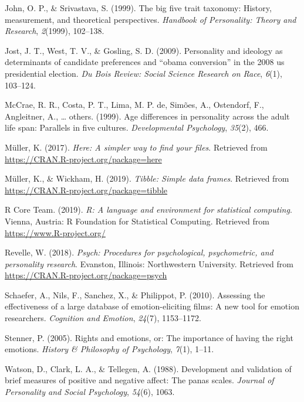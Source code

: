 \documentclass[man]{apa6}
\begin{document}
\hypertarget{ref-john1999big}{}
John, O. P., \& Srivastava, S. (1999). The big five trait taxonomy:
History, measurement, and theoretical perspectives. \emph{Handbook of
Personality: Theory and Research}, \emph{2}(1999), 102--138.

\hypertarget{ref-jost2009personality}{}
Jost, J. T., West, T. V., \& Gosling, S. D. (2009). Personality and
ideology as determinants of candidate preferences and ``obama
conversion'' in the 2008 us presidential election. \emph{Du Bois Review:
Social Science Research on Race}, \emph{6}(1), 103--124.

\hypertarget{ref-mccrae1999age}{}
McCrae, R. R., Costa, P. T., Lima, M. P. de, Simões, A., Ostendorf, F.,
Angleitner, A., \ldots{} others. (1999). Age differences in personality
across the adult life span: Parallels in five cultures.
\emph{Developmental Psychology}, \emph{35}(2), 466.

\hypertarget{ref-R-here}{}
Müller, K. (2017). \emph{Here: A simpler way to find your files}.
Retrieved from \url{https://CRAN.R-project.org/package=here}

\hypertarget{ref-R-tibble}{}
Müller, K., \& Wickham, H. (2019). \emph{Tibble: Simple data frames}.
Retrieved from \url{https://CRAN.R-project.org/package=tibble}

\hypertarget{ref-R-base}{}
R Core Team. (2019). \emph{R: A language and environment for statistical
computing}. Vienna, Austria: R Foundation for Statistical Computing.
Retrieved from \url{https://www.R-project.org/}

\hypertarget{ref-R-psych}{}
Revelle, W. (2018). \emph{Psych: Procedures for psychological,
psychometric, and personality research}. Evanston, Illinois:
Northwestern University. Retrieved from
\url{https://CRAN.R-project.org/package=psych}

\hypertarget{ref-schaefer2010}{}
Schaefer, A., Nils, F., Sanchez, X., \& Philippot, P. (2010). Assessing
the effectiveness of a large database of emotion-eliciting films: A new
tool for emotion researchers. \emph{Cognition and Emotion},
\emph{24}(7), 1153--1172.

\hypertarget{ref-stenner2005rights}{}
Stenner, P. (2005). Rights and emotions, or: The importance of having
the right emotions. \emph{History \& Philosophy of Psychology},
\emph{7}(1), 1--11.

\hypertarget{ref-watson1988development}{}
Watson, D., Clark, L. A., \& Tellegen, A. (1988). Development and
validation of brief measures of positive and negative affect: The panas
scales. \emph{Journal of Personality and Social Psychology},
\emph{54}(6), 1063.
\end{document}
